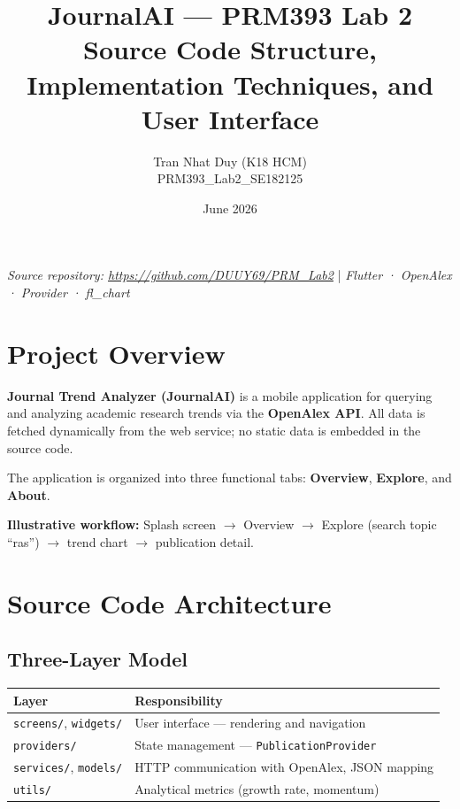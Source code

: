 \documentclass[11pt,a4paper]{article}
\title{\textbf{JournalAI — PRM393 Lab 2}\\[4pt]
\large Source Code Structure, Implementation Techniques, and User Interface}
\author{Tran Nhat Duy (K18 HCM) \\ PRM393\_Lab2\_SE182125}
\date{June 2026}
\begin{document}
\maketitle
\thispagestyle{empty}
\vspace{-0.8em}
\begin{center}
\textit{Source repository: \url{https://github.com/DUUY69/PRM_Lab2}} \quad|\quad
\textit{Flutter · OpenAlex · Provider · fl\_chart}
\end{center}
\vspace{0.8em}

\tableofcontents
\newpage

\section{Project Overview}

\textbf{Journal Trend Analyzer (JournalAI)} is a mobile application for querying and analyzing academic research trends via the \textbf{OpenAlex API}. All data is fetched dynamically from the web service; no static data is embedded in the source code.

The application is organized into three functional tabs: \textbf{Overview}, \textbf{Explore}, and \textbf{About}.

\textbf{Illustrative workflow:} Splash screen $\rightarrow$ Overview $\rightarrow$ Explore (search topic ``ras'') $\rightarrow$ trend chart $\rightarrow$ publication detail.

\section{Source Code Architecture}

\subsection{Three-Layer Model}
\begin{center}
\begin{tabular}{@{}ll@{}}
\toprule
\textbf{Layer} & \textbf{Responsibility} \\
\midrule
\texttt{screens/}, \texttt{widgets/} & User interface — rendering and navigation \\
\texttt{providers/} & State management — \texttt{PublicationProvider} \\
\texttt{services/}, \texttt{models/} & HTTP communication with OpenAlex, JSON mapping \\
\texttt{utils/} & Analytical metrics (growth rate, momentum) \\
\bottomrule
\end{tabular}
\end{center}
\end{document}
